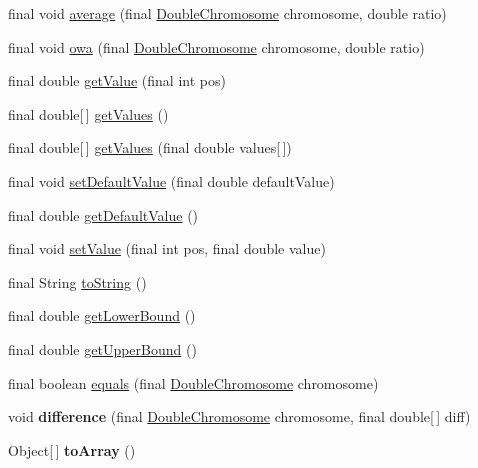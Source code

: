 \begin{DoxyCompactItemize}
\item 
final void \hyperlink{classjenes_1_1chromosome_1_1_double_chromosome_a83b26a42b307ce1316523e262f044fdd}{average} (final \hyperlink{classjenes_1_1chromosome_1_1_double_chromosome}{Double\-Chromosome} chromosome, double ratio)
\item 
final void \hyperlink{classjenes_1_1chromosome_1_1_double_chromosome_aeebe5bd21dbc2e8dbbdc135d4d10a4cc}{owa} (final \hyperlink{classjenes_1_1chromosome_1_1_double_chromosome}{Double\-Chromosome} chromosome, double ratio)
\item 
final double \hyperlink{classjenes_1_1chromosome_1_1_double_chromosome_acb68cbcac3e7859d4f380530355012c8}{get\-Value} (final int pos)
\item 
final double\mbox{[}$\,$\mbox{]} \hyperlink{classjenes_1_1chromosome_1_1_double_chromosome_a3dea8e4aee9041437b101d1f74d10d1f}{get\-Values} ()
\item 
final double\mbox{[}$\,$\mbox{]} \hyperlink{classjenes_1_1chromosome_1_1_double_chromosome_a0e7543f12f4ab7591f9b4687c44c801c}{get\-Values} (final double values\mbox{[}$\,$\mbox{]})
\item 
final void \hyperlink{classjenes_1_1chromosome_1_1_double_chromosome_ab0f087d0d5ac5ac273c63c4e3af2efff}{set\-Default\-Value} (final double default\-Value)
\item 
final double \hyperlink{classjenes_1_1chromosome_1_1_double_chromosome_ae129a0daa2e01593859f5b26c508d36b}{get\-Default\-Value} ()
\item 
final void \hyperlink{classjenes_1_1chromosome_1_1_double_chromosome_a4581d7735d8ed661473b0e72ff19f956}{set\-Value} (final int pos, final double value)
\item 
final String \hyperlink{classjenes_1_1chromosome_1_1_double_chromosome_aeaf1116586c3fac1fa8c1dad28b7f727}{to\-String} ()
\item 
final double \hyperlink{classjenes_1_1chromosome_1_1_double_chromosome_aa45c550b4cb16cba001dd6c754a5d8bd}{get\-Lower\-Bound} ()
\item 
final double \hyperlink{classjenes_1_1chromosome_1_1_double_chromosome_a7f4fe0c4dd1645f02ebbb2633d6610c8}{get\-Upper\-Bound} ()
\item 
final boolean \hyperlink{classjenes_1_1chromosome_1_1_double_chromosome_ad661abf584ceb5195b6b248798709fc9}{equals} (final \hyperlink{classjenes_1_1chromosome_1_1_double_chromosome}{Double\-Chromosome} chromosome)
\item 
\hypertarget{classjenes_1_1chromosome_1_1_double_chromosome_a10f461747c9f99c02405626cf82aee46}{void {\bfseries difference} (final \hyperlink{classjenes_1_1chromosome_1_1_double_chromosome}{Double\-Chromosome} chromosome, final double\mbox{[}$\,$\mbox{]} diff)}\label{classjenes_1_1chromosome_1_1_double_chromosome_a10f461747c9f99c02405626cf82aee46}

\item 
\hypertarget{classjenes_1_1chromosome_1_1_double_chromosome_a101d1eb5ebc632c0c5d0a1c5b65daa90}{Object\mbox{[}$\,$\mbox{]} {\bfseries to\-Array} ()}\label{classjenes_1_1chromosome_1_1_double_chromosome_a101d1eb5ebc632c0c5d0a1c5b65daa90}

\end{DoxyCompactItemize}
